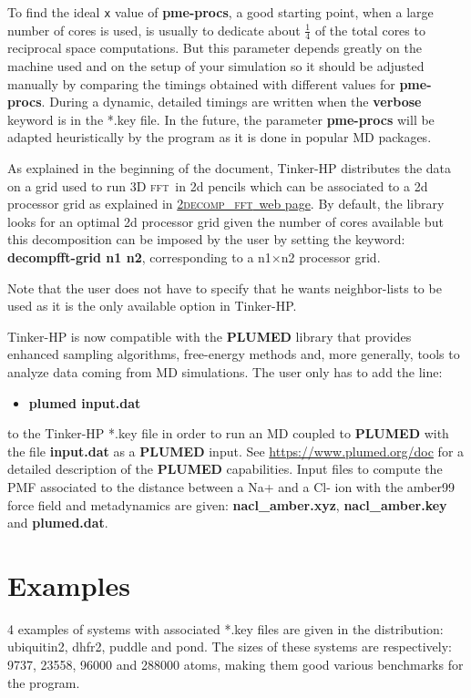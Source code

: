 \documentclass[peerreview]{IEEEtran}
\def\fft{\textsc{fft}}
\def\decomp{\textsc{2decomp\_fft}}
\begin{document}
\vskip5mm
To find the ideal \texttt{x} value of \textbf{pme-procs}, a good starting point, when a large number of cores is used, is usually to dedicate about $\frac{1}{4}$ of the total cores to reciprocal space computations. But this parameter depends greatly on the machine used and on the setup of your simulation so it should be adjusted manually by comparing the timings obtained with different values for \textbf{pme-procs}. During a dynamic, detailed timings are written when the \textbf{verbose} keyword is in the *.key file. In the future, the parameter \textbf{pme-procs} will be adapted heuristically by the program as it is done in popular MD packages.

\vskip5mm
As explained in the beginning of the document, Tinker-HP distributes the data on a grid used to run 3D \fft\  in 2d pencils which can be associated to a 2d processor grid as explained in \href{http://www.2decomp.org/decomp.html}{\decomp\ web page}. By default, the library looks for an optimal 2d processor grid given the number of cores available but this decomposition can be imposed by the user by setting the keyword: \textbf{decompfft-grid n1 n2}, corresponding to a n1$\times$n2 processor grid.

\vskip5mm
Note that the user does not have to specify that he wants neighbor-lists to be used as it is the only available option in Tinker-HP.

\vskip5mm
Tinker-HP is now compatible with the \textbf{PLUMED} library that provides enhanced sampling algorithms, free-energy methods and, more generally, tools to analyze data coming from MD simulations. The user only has to add the line: 
\begin{itemize}
\item[]\textbf{plumed input.dat}
\end{itemize}
to the Tinker-HP *.key file in order to run an MD coupled to \textbf{PLUMED} with the file \textbf{input.dat} as a \textbf{PLUMED} input. See \url{https://www.plumed.org/doc} for a detailed description of the \textbf{PLUMED} capabilities. Input files to compute the PMF associated to the distance between a Na+ and a Cl- ion with the amber99 force field and metadynamics are given: \textbf{nacl\_amber.xyz}, \textbf{nacl\_amber.key} and \textbf{plumed.dat}.
\section{Examples}
4 examples of systems with associated *.key files are given in the distribution: ubiquitin2, dhfr2, puddle and pond. The sizes of these systems are respectively: 9737, 23558, 96000 and 288000 atoms, making them good various benchmarks for the program. 
\end{document}

